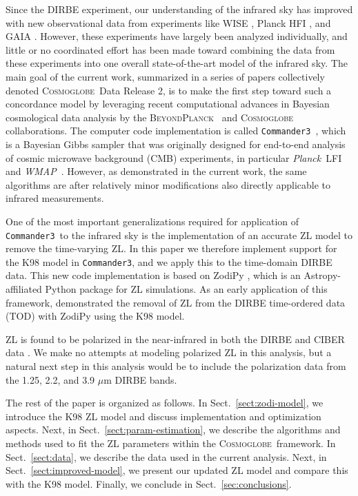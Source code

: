 \documentclass[twocolumn]{aa}
\def\commanderthree{\texttt{Commander3}}
\def\Planck{\textit{Planck}}
\def\WMAP{\textit{WMAP}}
\newcommand{\BP}{\textsc{BeyondPlanck}}
\newcommand{\cosmoglobe}{\textsc{Cosmoglobe}}
\begin{document}
Since the DIRBE experiment, our
understanding of the infrared sky has improved with new observational
data from experiments like WISE \citep{wright:2010}, Planck HFI
\citep{planck2016-l03}, and GAIA \citep{gaia:2016}. However, these
experiments have largely been analyzed individually, and little or no
coordinated effort has been made toward combining the data from these
experiments into one overall state-of-the-art model of the infrared
sky. The main goal of the current work, summarized in a series of
papers collectively denoted \cosmoglobe\ Data Release 2, is to make
the first step toward such a concordance model by leveraging recent
computational advances in Bayesian cosmological data analysis by the
\BP\ \citep[][and references therein]{BP2023,Galloway2023} and
\cosmoglobe\ \citep{Watts2023} collaborations. The computer code
implementation is called \commanderthree\ \citep{Galloway2023}, which
is a Bayesian Gibbs sampler that was originally designed for
end-to-end analysis of cosmic microwave background (CMB) experiments,
in particular \Planck\ LFI \citep{planck2016-l02} and \WMAP\
\citep{bennett2012}. However, as demonstrated in the current work, the
same algorithms are after relatively minor modifications also directly
applicable to infrared measurements.

One of the most important generalizations required for application of
\commanderthree\ to the infrared sky is the implementation of an
accurate ZL model to remove the time-varying ZL. In this paper we therefore implement
support for the K98 model in \commanderthree, and we apply this to the
time-domain DIRBE data. This new code implementation is based on ZodiPy 
\citep{San2024}, which is an Astropy-affiliated Python package for ZL 
simulations. As an early application of this framework, \cite{San2022} 
demonstrated the removal of ZL from the DIRBE time-ordered data (TOD) with ZodiPy using the 
K98 model.

ZL is found to be polarized in the near-infrared in both the DIRBE and 
CIBER data \citep{Takimoto2022,Takimoto2023}. We make no attempts at 
modeling polarized ZL in this analysis, but a natural next step in this 
analysis would be to include the polarization data from the 1.25, 2.2, 
and 3.9 $\mu$m DIRBE bands.

The rest of the paper is organized as follows. In
Sect.~\ref{sect:zodi-model}, we introduce the K98 ZL model and discuss
implementation and optimization aspects. Next, in 
Sect.~\ref{sect:param-estimation}, we describe the algorithms and methods
used to fit the ZL parameters within the \cosmoglobe\  framework.
In Sect.~\ref{sect:data}, we describe the data used in the current
analysis. Next, in Sect.~\ref{sect:improved-model}, we present our updated 
ZL model and compare this with the K98 model. Finally, we
conclude in Sect.~\ref{sec:conclusions}.
\end{document}
